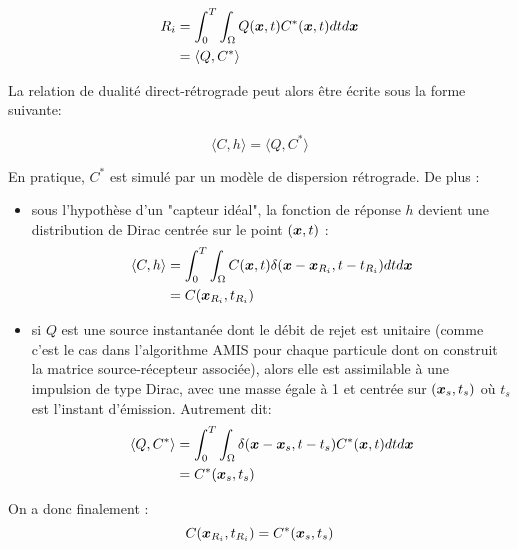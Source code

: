 {\begin{equation}
\begin{split}
R_i &= \int_0^T \int_{\Omega} Q({\bm{x}},t)C^*({\bm{x}}, t)dtd{\bm{x}} \\
&= \langle Q, C^* \rangle
\end{split}
\end{equation}

La relation de dualité direct-rétrograde peut alors être écrite sous la forme suivante: 

\begin{equation}
\langle C,h \rangle = \langle Q, C^* \rangle
\end{equation}

En pratique, $C^*$ est simulé par un modèle de dispersion rétrograde. De plus : 
\begin{itemize}
	\item sous l'hypothèse d'un "capteur idéal", la fonction de réponse $h$ devient une distribution de Dirac centrée sur le point $({\bm{x}}, t)$ : 
	\begin{equation}
	\begin{split}
		\langle C,h \rangle &= \int_0^T \int_{\Omega} C({\bm{x}},t)\delta({\bm{x}} - {\bm{x}}_{R_i}, t - t_{R_i})dtd{\bm{x}} \\
		& = C({\bm{x}}_{R_i}, t_{R_i})
		\end{split}
	\end{equation}
	\item si $Q$ est une source instantanée dont le débit de rejet est unitaire (comme c'est le cas dans l'algorithme AMIS pour chaque particule dont on construit la matrice source-récepteur associée), alors elle est assimilable à une impulsion de type Dirac, avec une masse égale à 1 et centrée sur $({\bm{x}_s}, t_s)$ où $t_s$ est l'instant d'émission. Autrement dit:
	\begin{equation}
	\begin{split}
		\langle Q, C^* \rangle &= \int_0^T \int_{\Omega} \delta({\bm{x}} - {\bm{x}_s}, t-t_s)C^*({\bm{x}}, t) dt d{\bm{x}} \\
		&= C^*({\bm{x}_s}, t_s)
		\end{split}
	\end{equation}
\end{itemize}

On a donc finalement : 
\begin{equation}
C({\bm{x}}_{R_i}, t_{R_i}) = C^* ({\bm{x}_s}, t_s)
\end{equation}




}
